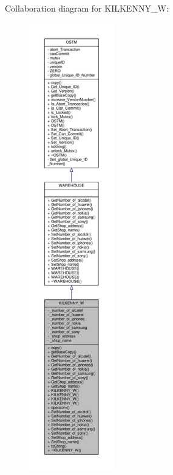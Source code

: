 Collaboration diagram for K\+I\+L\+K\+E\+N\+N\+Y\+\_\+W\+:\nopagebreak
\begin{figure}[H]
\begin{center}
\leavevmode
\includegraphics[height=550pt]{class_k_i_l_k_e_n_n_y___w__coll__graph}
\end{center}
\end{figure}
